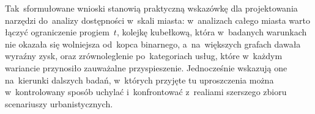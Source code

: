 Tak~sformułowane wnioski stanowią praktyczną wskazówkę dla projektowania
narzędzi do~analizy dostępności w~skali miasta: w~analizach całego miasta
warto łączyć ograniczenie progiem~$t$, kolejkę kubełkową, która w~badanych
warunkach nie okazała się wolniejsza od~kopca binarnego, a~na~większych
grafach dawała wyraźny zysk, oraz zrównoleglenie po~kategoriach usług,
które w~każdym wariancie przynosiło zauważalne przyspieszenie.
Jednocześnie wskazują one na~kierunki dalszych
badań, w~których przyjęte tu uproszczenia można w~kontrolowany sposób
uchylać i~konfrontować z~realiami szerszego zbioru scenariuszy urbanistycznych.
